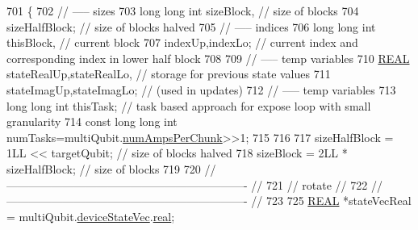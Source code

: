 \begin{DoxyCode}
701                                                                                                            
                           \{
702     \textcolor{comment}{// ----- sizes}
703     \textcolor{keywordtype}{long} \textcolor{keywordtype}{long} \textcolor{keywordtype}{int} sizeBlock,                                           \textcolor{comment}{// size of blocks}
704          sizeHalfBlock;                                       \textcolor{comment}{// size of blocks halved}
705     \textcolor{comment}{// ----- indices}
706     \textcolor{keywordtype}{long} \textcolor{keywordtype}{long} \textcolor{keywordtype}{int} thisBlock,                                           \textcolor{comment}{// current block}
707          indexUp,indexLo;                                     \textcolor{comment}{// current index and corresponding index in
       lower half block}
708 
709     \textcolor{comment}{// ----- temp variables}
710     \mbox{\hyperlink{QuEST__precision_8h_a4b654506f18b8bfd61ad2a29a7e38c25}{REAL}}   stateRealUp,stateRealLo,                             \textcolor{comment}{// storage for previous state values}
711            stateImagUp,stateImagLo;                             \textcolor{comment}{// (used in updates)}
712     \textcolor{comment}{// ----- temp variables}
713     \textcolor{keywordtype}{long} \textcolor{keywordtype}{long} \textcolor{keywordtype}{int} thisTask;                                   \textcolor{comment}{// task based approach for expose loop with
       small granularity}
714     \textcolor{keyword}{const} \textcolor{keywordtype}{long} \textcolor{keywordtype}{long} \textcolor{keywordtype}{int} numTasks=multiQubit.\mbox{\hyperlink{structMultiQubit_a1cad83601a78635dd278259c7ed54f18}{numAmpsPerChunk}}>>1;
715 
716 
717     sizeHalfBlock = 1LL << targetQubit;                               \textcolor{comment}{// size of blocks halved}
718     sizeBlock     = 2LL * sizeHalfBlock;                           \textcolor{comment}{// size of blocks}
719 
720     \textcolor{comment}{// ---------------------------------------------------------------- //}
721     \textcolor{comment}{//            rotate                                                //}
722     \textcolor{comment}{// ---------------------------------------------------------------- //}
723 
725     \mbox{\hyperlink{QuEST__precision_8h_a4b654506f18b8bfd61ad2a29a7e38c25}{REAL}} *stateVecReal = multiQubit.\mbox{\hyperlink{structMultiQubit_a59ac613486a41b8c9a4b6e79cc8d2cc3}{deviceStateVec}}.\mbox{\hyperlink{structComplexArray_a4195cac6c784ea1b6271f1c7dba1548a}{real}};

\end{DoxyCode}
